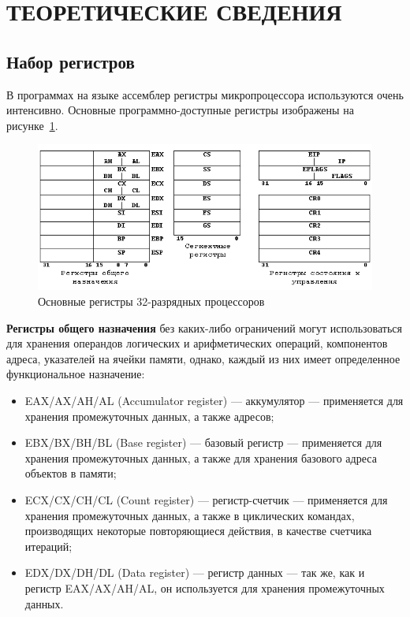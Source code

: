 \section{ТЕОРЕТИЧЕСКИЕ СВЕДЕНИЯ}

\subsection{Набор регистров}

В программах на языке ассемблер регистры микропроцессора используются очень интенсивно.
Основные программно-доступные регистры изображены на рисунке~\ref{fig:registers}.

\begin{figure}[htbp]
  \centering
  \includegraphics[width=150mm]{pic/registers}
  \caption{Основные регистры 32-разрядных процессоров}\label{fig:registers}
\end{figure}

\textbf{Регистры общего назначения} без каких-либо ограничений могут использоваться
для хранения операндов логических и арифметических операций, компонентов адреса, указателей
на ячейки памяти, однако, каждый из них имеет определенное функциональное назначение:

\begin{itemize}
\item EAX/AX/AH/AL (Accumulator register) --- аккумулятор --- применяется для хранения
  промежуточных данных, а также адресов;
\item EBX/BX/BH/BL (Base register) --- базовый регистр --- применяется для хранения
  промежуточных данных, а также для хранения базового адреса объектов в памяти;
\item ECX/CX/CH/CL (Count register) --- регистр-счетчик --- применяется для хранения
  промежуточных данных, а также в циклических командах, производящих некоторые
  повторяющиеся действия, в качестве счетчика итераций;
\item EDX/DX/DH/DL (Data register) --- регистр данных --- так же, как и регистр EAX/AX/AH/AL, он
  используется для хранения промежуточных данных.
\end{itemize}

